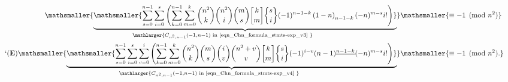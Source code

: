 \documentclass[12pt,reqno]{article}
\numberwithin{sfootnote}{section}
\numberwithin{equation}{section}
\theoremstyle{DefaultTheoremStyle}
\theoremstyle{definition}
\newcommand{\ExampleQEDSymbol}{`(\text{\rm{\bf E}})}
\newcommand{\undersetbrace}[2]{\ensuremath{\underset{\mathlarger{#1}}{\mathsmaller{\underbrace{#2}}}}}
\newcommand{\gkpSI}[2]{\ensuremath{\genfrac{\lbrack}{\rbrack}{0pt}{}{#1}{#2}}}
\newcommand{\gkpSII}[2]{\ensuremath{\genfrac{\{}{\}}{0pt}{}{#1}{#2}}}
\newcommand{\FFactII}[2]{\ensuremath{#1^{\underline{#2}}}}
\newcommand{\Pochhammer}[2]{\ensuremath{\left(#1\right)_{#2}}}
\begin{document}
\begin{align*} 
\undersetbrace{C_{n^2,n-1}(-1, n-1) 
     \text{ in \eqref{eqn_Chn_formula_stmts-exp_v3} }}{ 
     \mathsmaller{ 
     \sum\limits_{s=0}^{n-1} \sum\limits_{i=0}^{s} \left( 
     \sum\limits_{k=0}^{n-1} \sum\limits_{m=0}^{k} 
     \binom{n^2}{k} \binom{n^2}{i} \binom{m}{s} 
     \gkpSI{k}{m} \gkpSII{s}{i} (-1)^{n-1-k} 
     \Pochhammer{1-n}{n-1-k} (-n)^{m-s} i! 
     \right)} 
     } 
     & 
     \mathsmaller{ 
     \equiv -1 \pmod{n^2} 
     } \\ 
\tag*{$\ExampleQEDSymbol$} 
     \undersetbrace{C_{n^2,n-1}(-1, n-1) 
     \text{ in \eqref{eqn_Chn_formula_stmts-exp_v4} }}{ 
\mathsmaller{ 
     \sum\limits_{s=0}^{n-1} \sum\limits_{i=0}^{s} \sum\limits_{v=0}^{i} 
     \left( 
     \sum\limits_{k=0}^{n-1} \sum\limits_{m=0}^{k} 
     \binom{n^2}{k} \binom{m}{s} \binom{i}{v} \binom{n^2+v}{v} 
     \gkpSI{k}{m} \gkpSII{s}{i} (-1)^{i-v} 
     \FFactII{(n-1)}{n-1-k} (-n)^{m-s} i! 
     \right)} 
     } 
     & 
     \mathsmaller{ 
     \equiv -1 \pmod{n^2}. 
     } 
\end{align*} 
\end{document}
